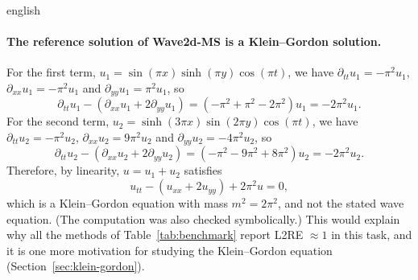 \documentclass[../0000.tex]{subfiles}
\begin{document}
\begin{hyphenrules}{english}
\paragraph{The reference solution of Wave2d-MS is a Klein--Gordon solution.}
For the first term, $u_1=\sin(\pi x)\sinh(\pi y)\cos(\pi t)$, we have $\partial_{tt}u_1=-\pi^2u_1$,
$\partial_{xx}u_1=-\pi^2u_1$ and $\partial_{yy}u_1=\pi^2u_1$, so
\[
  \partial_{tt}u_1-(\partial_{xx}u_1+2\partial_{yy}u_1)=(-\pi^2+\pi^2-2\pi^2)u_1=-2\pi^2u_1.
\]
For the second term, $u_2=\sinh(3\pi x)\sin(2\pi y)\cos(\pi t)$, we have $\partial_{tt}u_2=-\pi^2u_2$,
$\partial_{xx}u_2=9\pi^2u_2$ and $\partial_{yy}u_2=-4\pi^2u_2$, so
\[
  \partial_{tt}u_2-(\partial_{xx}u_2+2\partial_{yy}u_2)=(-\pi^2-9\pi^2+8\pi^2)u_2=-2\pi^2u_2.
\]
Therefore, by linearity, $u=u_1+u_2$ satisfies
\begin{equation}
  u_{tt}-(u_{xx}+2u_{yy})+2\pi^2u=0,
  \label{eq:wave2dms-kg}
\end{equation}
which is a Klein--Gordon equation with mass $m^2=2\pi^2$, and not the stated wave equation. (The
computation was also checked symbolically.) This would explain why all the methods of
Table~\ref{tab:benchmark} report L2RE $\approx1$ in this task, and it is one more motivation for studying the
Klein--Gordon equation (Section~\ref{sec:klein-gordon}).

\end{hyphenrules}

\ifSubfilesClassLoaded{}{}
\end{document}
